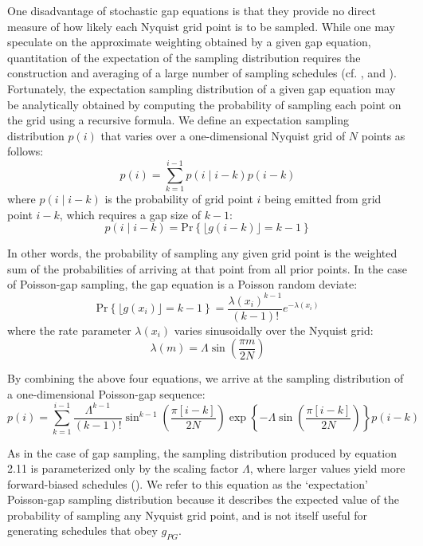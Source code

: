 \begin{doublespace}
One disadvantage of stochastic gap equations is that they provide no direct
measure of how likely each Nyquist grid point is to be sampled. While one may
speculate on the approximate weighting obtained by a given gap equation,
quantitation of the expectation of the sampling distribution requires the
construction and averaging of a large number of sampling schedules
(cf. ,  and ).
Fortunately, the expectation sampling distribution of a given gap equation
may be analytically obtained by computing the probability of sampling each
point on the grid using a recursive formula. We define an expectation
sampling distribution $p(i)$ that varies over a one-dimensional Nyquist
grid of $N$ points as follows:
\begin{equation}
p(i) = \sum_{k=1}^{i-1} p(i \mid i-k) p(i-k)
\end{equation}
where $p(i \mid i-k)$ is the probability of grid point $i$ being emitted from
grid point $i-k$, which requires a gap size of $k-1$:
\begin{equation}
p(i \mid i-k) = \mathrm{Pr}\left\{
 \lfloor g(i-k) \rfloor = k - 1
\right\}
\end{equation}

In other words, the probability of sampling any given grid point is the
weighted sum of the probabilities of arriving at that point from all prior
points. In the case of Poisson-gap sampling, the gap equation is a Poisson
random deviate:
\begin{equation}
\mathrm{Pr}\left\{ \lfloor g(x_i) \rfloor = k - 1 \right\} =
 \frac{\lambda(x_i)^{k-1}}{(k-1)!} e^{-\lambda(x_i)}
\end{equation}
where the rate parameter $\lambda(x_i)$ varies sinusoidally over the Nyquist
grid:
\begin{equation}
\lambda(m) = \Lambda \sin \left( \frac{\pi m}{2 N} \right)
\end{equation}

By combining the above four equations, we arrive at the sampling distribution
of a one-dimensional Poisson-gap sequence:
\begin{equation}
p(i) = \sum_{k=1}^{i-1} \frac{\Lambda^{k-1}}{(k-1)!}
 \sin^{k-1} \left( \frac{\pi [i-k]}{2 N} \right)
 \exp\left\{
  -\Lambda \sin \left( \frac{\pi [i-k]}{2 N} \right)
 \right\}
p(i-k)
\end{equation}

As in the case of gap sampling, the sampling distribution produced by equation
2.11 is parameterized only by the scaling factor $\Lambda$, where larger values
yield more forward-biased schedules (). We refer
to this equation as the `expectation' Poisson-gap sampling distribution
because it describes the expected value of the probability of sampling any
Nyquist grid point, and is not itself useful for generating schedules that
obey $g_{PG}$.
\end{doublespace}


